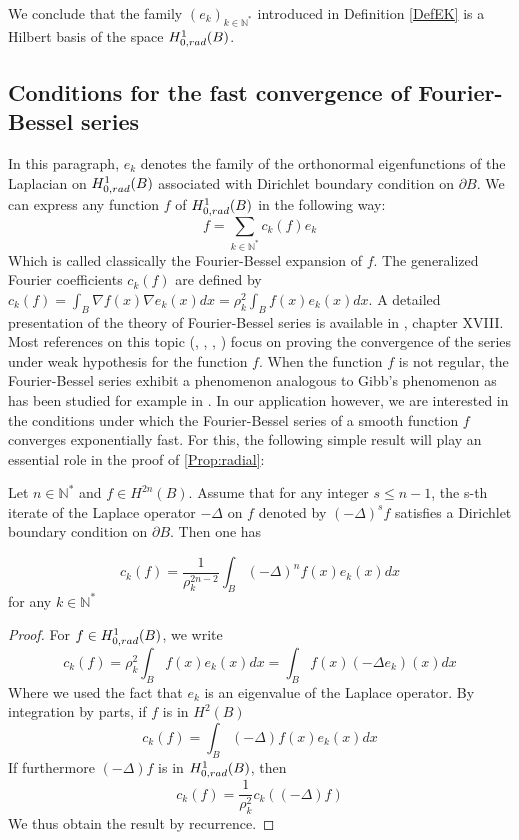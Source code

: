 \documentclass[11pt,a4paper]{article}
\begin{document}
We conclude that the family $(e_k)_{k\in \mathbb{N}^*}$ introduced in Definition \ref{DefEK} is a Hilbert basis of the space $H^1_{0,rad}(B)$. 

\subsection{Conditions for the fast convergence of Fourier-Bessel series}
\label{CondFastConv}
In this paragraph, $e_{k}$ denotes the family of the orthonormal eigenfunctions of the Laplacian on $H^1_{0,rad}(B)$ associated with Dirichlet boundary condition on $\partial B$. 
We can express any function $f$ of $H^1_{0,rad}(B)$ in the following way: 
\[f = \sum_{k\in \mathbb{N}^*}c_k(f)e_{k}\]
Which is called classically the Fourier-Bessel expansion of $f$. The generalized Fourier coefficients $c_k(f)$ are defined by $c_k(f) = \displaystyle \int_B \nabla f(x)\nabla e_{k}(x) dx = \rho_k^2 \int_{B}{f(x) e_k(x)dx}$. A detailed presentation of the theory of Fourier-Bessel series is available in \cite{watson1995treatise}, chapter XVIII. Most references on this topic (\cite{stempak2002convergence}, \cite{guadalupe1993mean}, \cite{Balodis1999}, \cite{colzani1993equiconvergence}) focus on proving the convergence of the series under weak hypothesis for the function $f$. When the function $f$ is not regular, the Fourier-Bessel series exhibit a phenomenon analogous to Gibb's phenomenon as has been studied for example in \cite{wilton1928gibbs}. In our application however, we are interested in the conditions under which the Fourier-Bessel series of a smooth function $f$ converges exponentially fast. For this, the following simple result will play an essential role in the proof of \ref{Prop:radial}:
\begin{Prop} Let $n\in \mathbb{N}^*$ and $f \in H^{2n}(B)$. Assume that for any integer $s\leq n-1$, the s-th iterate of the Laplace operator $-\Delta$ on $f$ denoted by $(-\Delta)^s f$ satisfies a Dirichlet boundary condition on $\partial B$. Then one has 

\[ c_k(f) = \dfrac{1}{\rho_{k}^{2n-2}} \int_{B}\left(-\Delta\right)^n f(x)e_k(x) dx\] for any $k \in \mathbb{N}^*$
\begin{proof}
For $f \in H^1_{0,rad}(B)$, we write 
\[c_k(f) = \rho_k^2\int_{B}f(x) e_k(x)dx = \int_{B}f(x)(-\Delta e_k)(x)dx \] 
Where we used the fact that $e_k$ is an eigenvalue of the Laplace operator. By integration by parts, if $f$ is in $H^2(B)$ 
\[c_k(f) = \int_{B}(-\Delta)f(x) e_k(x)dx\]
If furthermore $(-\Delta)f$ is in $H^1_{0,rad}(B)$, then 
\[ c_k(f) = \dfrac{1}{\rho_k^2}c_k((-\Delta)f)\] 
We thus obtain the result by recurrence. 
\end{proof}
\label{PropDecrCond}
\end{Prop}
\end{document}
